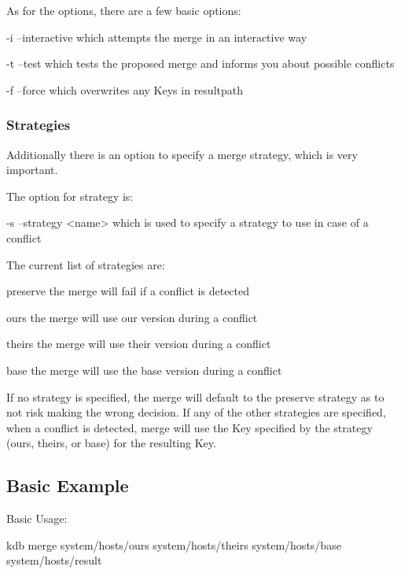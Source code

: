 As for the options, there are a few basic options\+: \begin{DoxyVerb}-i  --interactive                   which attempts the merge in an interactive way

    -t  --test                                      which tests the proposed merge and informs you about possible conflicts

    -f --force                                      which overwrites any Keys in resultpath
\end{DoxyVerb}


\subsubsection*{Strategies}

Additionally there is an option to specify a merge strategy, which is very important.

The option for strategy is\+: \begin{DoxyVerb}    -s --strategy <name>            which is used to specify a strategy to use in case of a conflict
\end{DoxyVerb}


The current list of strategies are\+: \begin{DoxyVerb}    preserve                        the merge will fail if a conflict is detected

    ours                            the merge will use our version during a conflict

    theirs                          the merge will use their version during a conflict

    base                            the merge will use the base version during a conflict
\end{DoxyVerb}


If no strategy is specified, the merge will default to the preserve strategy as to not risk making the wrong decision. If any of the other strategies are specified, when a conflict is detected, merge will use the Key specified by the strategy (ours, theirs, or base) for the resulting Key.

\subsection*{Basic Example}

Basic Usage\+: \begin{DoxyVerb}    kdb merge system/hosts/ours system/hosts/theirs system/hosts/base system/hosts/result
\end{DoxyVerb}


